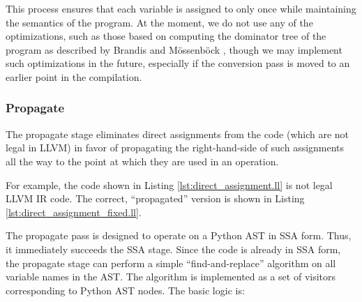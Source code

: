\documentclass[11pt,twocolumn]{article}
\begin{document}
This process ensures that each variable is assigned to only once while
maintaining the semantics of the program. At the moment, we do not use
any of the optimizations, such as those based on computing the
dominator tree of the program as described by Brandis and
M\"{o}ssenb\"{ock} \cite{brandis-mossenbock}, though we may implement such
optimizations in the future, especially if the conversion pass is
moved to an earlier point in the compilation.

\subsubsection{Propagate}
\label{sec:stage-Propagate}

The propagate stage eliminates direct assignments from the code (which
are not legal in LLVM) in favor of propagating the right-hand-side of
such assignments all the way to the point at which they are used in an
operation. 

For example, the code shown in Listing \ref{lst:direct_assignment.ll}
is not legal LLVM IR code. The correct, ``propagated'' version is
shown in Listing \ref{lst:direct_assignment_fixed.ll}.





The propagate pass is designed to operate on a Python AST in SSA
form. Thus, it immediately succeeds the SSA stage. Since the code is
already in SSA form, the propagate stage can perform a simple
``find-and-replace'' algorithm on all variable names in the AST. The
algorithm is implemented as a set of visitors corresponding to Python
AST nodes. The basic logic is:
\end{document}
